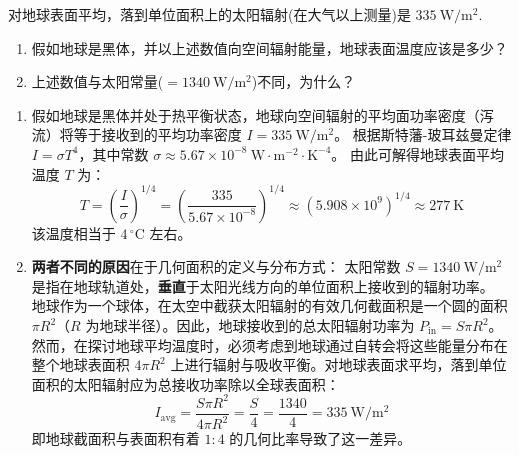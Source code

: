 \begin{exercise}\label{ex:22.4}
对地球表面平均，落到单位面积上的太阳辐射(在大气以上测量)是 $335 \ \mathrm{W/m^2}$. 
\begin{enumerate}
  \item[(a)] 假如地球是黑体，并以上述数值向空间辐射能量，地球表面温度应该是多少？
  \item[(b)] 上述数值与太阳常量($=1340 \ \mathrm{W/m^2}$)不同，为什么？
\end{enumerate}
\end{exercise}
\begin{solution}
\begin{enumerate}
    \item[(a)] 假如地球是黑体并处于热平衡状态，地球向空间辐射的平均面功率密度（泻流）将等于接收到的平均功率密度 $I = 335 \ \mathrm{W/m^2}$。
    根据斯特藩-玻耳兹曼定律 $I = \sigma T^4$，其中常数 $\sigma \approx 5.67 \times 10^{-8} \ \mathrm{W \cdot m^{-2} \cdot K^{-4}}$。
    由此可解得地球表面平均温度 $T$ 为：
    $$ T = \left( \frac{I}{\sigma} \right)^{1/4} = \left( \frac{335}{5.67 \times 10^{-8}} \right)^{1/4} \approx (5.908 \times 10^9)^{1/4} \approx 277 \ \mathrm{K} $$
    该温度相当于 $4\,{}^\circ\mathrm{C}$ 左右。
    
    \item[(b)] \textbf{两者不同的原因}在于几何面积的定义与分布方式：
    太阳常数 $S = 1340 \ \mathrm{W/m^2}$ 是指在地球轨道处，\textbf{垂直}于太阳光线方向的单位面积上接收到的辐射功率。
    地球作为一个球体，在太空中截获太阳辐射的有效几何截面积是一个圆的面积 $\pi R^2$（$R$ 为地球半径）。因此，地球接收到的总太阳辐射功率为 $P_{\text{in}} = S \pi R^2$。
    然而，在探讨地球平均温度时，必须考虑到地球通过自转会将这些能量分布在整个地球表面积 $4\pi R^2$ 上进行辐射与吸收平衡。对地球表面求平均，落到单位面积的太阳辐射应为总接收功率除以全球表面积：
    $$ I_{\text{avg}} = \frac{S \pi R^2}{4\pi R^2} = \frac{S}{4} = \frac{1340}{4} = 335 \ \mathrm{W/m^2} $$
    即地球截面积与表面积有着 $1:4$ 的几何比率导致了这一差异。
\end{enumerate}
\end{solution}

